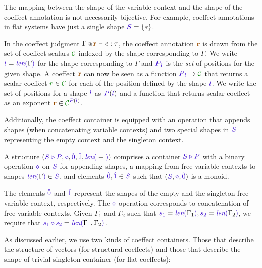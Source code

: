 The mapping between the shape of the variable context and the shape of the coeffect annotation
is not necessarily bijective. For example, coeffect annotations in flat systems have just a single
shape $\SH = \{ \ast \}$.

In the coeffect judgment $\coctx{\Gamma}{\aclrd{\textbf{r}}} \vdash e : \tau$, the coeffect annotation
$\aclrd{\textbf{r}}$ is drawn from the set of coeffect scalars $\C$ indexed by the shape corresponding
to $\Gamma$. We write $\sclrd{l} = \slen{\Gamma}$ for the shape corresponding to $\Gamma$ and
$\SP_{\sclrd{l}}$ is the \emph{set} of positions for the given shape. A coeffect $\aclrd{\textbf{r}}$
can now be seen as a function $\SP_{\sclrd{l}} \rightarrow \C$ that returns a scalar coeffect
$\cclrd{r}\in\C$ for each of the position defined by the shape $\sclrd{l}$.
We write the set of positions for a shape $\sclrd{l}$ as $\SP(\sclrd{l})$ and a function that
returns scalar coeffect as an exponent $\aclrd{\textbf{r}} \in \C^{\SP(\sclrd{l})}$.

Additionally, the coeffect container is equipped with an operation that appends shapes (when concatenating
variable contexts) and two special shapes in $\SH$ representing the empty context and the singleton
context.

\begin{definition}
\label{def:unified-cont}
A \emph{} structure $(\SHP, \stimes, \sempty, \sunit, \slen{-})$
comprises a container $\SHP$ with a binary operation $\stimes$ on $\SH$ for appending shapes, a
mapping from free-variable contexts to shapes $\slen{\Gamma} \in \SH$, and elements $\sempty,\sunit \in
\SH$ such that $(\SH, \stimes, \sempty)$ is a monoid.

The elements $\sempty$ and $\sunit$ represent the shapes of the empty and the singleton free-variable
context, respectively. The $\stimes$ operation corresponds to concatenation of free-variable contexts.
Given $\Gamma_1$ and $\Gamma_2$ such that $\sclrd{s_1}=\slen{\Gamma_1}, \sclrd{s_2}=\slen{\Gamma_2}$,
we require that $\sclrd{s_1}\,\stimes\,\sclrd{s_2}=\slen{\Gamma_1, \Gamma_2}$.
\end{definition}

\noindent
As discussed earlier, we use two kinds of coeffect containers. Those that describe the structure of vectors
(for structural coeffects) and those that describe the shape of trivial singleton container (for flat coeffects):

